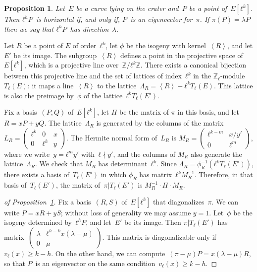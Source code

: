 \documentclass{lms}
\newtheorem{prop}[thm]{Proposition}
\def\mat#1{\begin{pmatrix}#1\end{pmatrix}}
\def\smat#1{{\def\arraystretch{.7}\mat{#1}}}
\def\chev#1{\left\langle#1\right\rangle}
\begin{document}
\begin{prop} \label{prop:diagonal-horizontal}
Let~$E$ be a curve lying on the crater and~$P$ be a point of~$E[ℓ^k]$.
Then $ℓ^h P$~is horizontal if, and only if, $P$~is an eigenvector for~$π$.
If $π(P) = λ P$ then we say that $ℓ^h P$~has direction~$λ$.
\end{prop}
Let $R$ be a point of $E$ of order~$ℓ^k$, let $ϕ$ be the isogeny 
with kernel~$\chev{R}$, and let $E'$ be its image. The subgroup~$\chev{R}$ defines a point in
the projective space of~$E[ℓ^k]$,
which is a projective line over~$ℤ/ℓ^k ℤ$.
There exists a canonical bijection~\cite[II.1.1]{SL2} between
this projective line and
the set of lattices of index~$ℓ^k$ in the $ℤ_ℓ$-module $T_ℓ(E)$:
it maps a line~$\chev{R}$ to the lattice~$Λ_R = \chev{R} + ℓ^k T_ℓ(E)$.
This lattice is also the preimage by~$ϕ$
of the lattice~$ℓ^k T_ℓ(E')$.

Fix a basis~$(P, Q)$ of~$E[ℓ^k]$, let $Π$ be the matrix of $π$
in this basis, and let~$R = x P + y Q$.
The lattice~$Λ_R$ is generated by the columns of the matrix
$L_R = \left (\begin{smallmatrix}ℓ^k & 0 & x\\0 & ℓ^k & y\end{smallmatrix} \right )$.
The Hermite normal form of~$L_R$
is 
$M_R = \left (\begin{smallmatrix}ℓ^{k-m} & x/y' \\ 0 & ℓ^m\end{smallmatrix}\right )$,
where we write~$y = ℓ^m y'$ with~$ℓ ∤y'$,
and the columns of $M_R$ also generate the lattice~$Λ_R$.
We check that $M_R$ has determinant~$ℓ^k$.
Since $Λ_R = ϕ_R^{-1} (ℓ^k T_{ℓ} (E'))$,
there exists a basis of~$T_ℓ(E')$
in which $ϕ_R$ has matrix~$ℓ^k M_R^{-1}$.
Therefore, in that basis of~$T_ℓ(E')$,
the matrix of~$π|T_ℓ(E')$ is $M_R^{-1} · Π · M_R^{}$.
\begin{proof}[of Proposition~\ref{prop:diagonal-horizontal}]
Fix a basis~$(R, S)$ of~$E[ℓ^k]$ that diagonalizes~$π$.
We can write $P = x R + y S$;
without loss of generality we may assume $y=1$.
Let~$ϕ$ be the isogeny determined by~$ℓ^h P$, and let~$E'$ be its image.
Then $π|T_ℓ(E')$ has matrix~$\left ( \begin{smallmatrix}λ& ℓ^{h-k} x (λ-μ)\\ 0&μ
\end{smallmatrix}\right )$.
This matrix is diagonalizable only if~$v_{ℓ}(x) ≥ k - h$.
On the other hand, we can compute~$(π - μ) P = x (λ - μ) R$,
so that $P$~is an eigenvector on the same condition~$v_{ℓ}(x) ≥ k-h$.
\end{proof}
\end{document}
